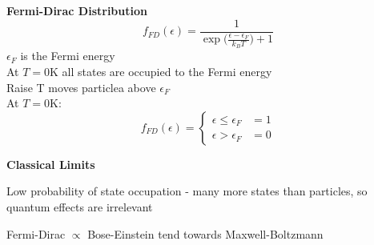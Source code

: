 \documentclass[a4paper, 11pt, normalem]{report}
\begin{document}
\textbf{Fermi-Dirac Distribution}
\begin{equation*}
    f_{FD}(\epsilon) = \frac{1}{\exp\big(\tfrac{\epsilon - \epsilon_F}{k_B T}\big) + 1}
\end{equation*}
$\epsilon_F$ is the Fermi energy \\
At $T = 0$K all states are occupied to the Fermi energy \\
Raise T moves particlea above $\epsilon_F$ \\
At $T = 0$K:
\begin{equation*}
    f_{FD}(\epsilon) =
    \begin{cases}
        \epsilon \leq \epsilon_F & = 1 \\
        \epsilon > \epsilon_F & = 0
    \end{cases}
\end{equation*}

\textbf{Classical Limits}

Low probability of state occupation - many more states than particles, so quantum effects are irrelevant

Fermi-Dirac $\propto$ Bose-Einstein tend towards Maxwell-Boltzmann
\end{document}
